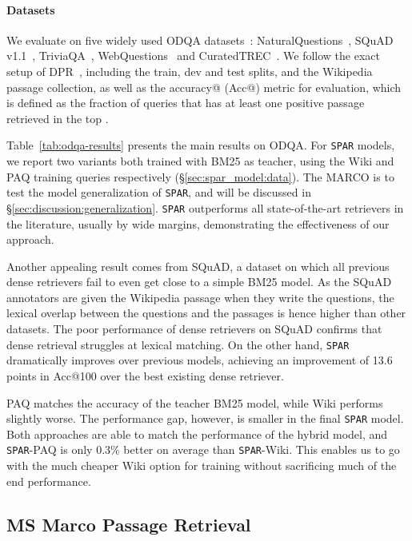 \documentclass[11pt]{article}
\newcommand{\spar}{\texttt{SPAR}\xspace}
\newcommand{\lexmodelsymbol}{\xspace}
\newcommand{\secref}[1]{\S\ref{#1}}
\begin{document}
\paragraph{Datasets}
We evaluate on five widely used ODQA datasets~\cite{lee-etal-2019-latent}: NaturalQuestions~\citep[NQ,][]{kwiatkowski-etal-2019-natural}, SQuAD v1.1~\citep{rajpurkar-etal-2016-squad}, TriviaQA~\citep{joshi-etal-2017-triviaqa}, WebQuestions~\citep[WebQ,][]{berant-etal-2013-semantic} and CuratedTREC~\citep[TREC,][]{trec}.
We follow the exact setup of DPR~\cite{karpukhin-etal-2020-dense}, including the train, dev and test splits, and the Wikipedia passage collection, as well as the accuracy@ (Acc@) metric for evaluation, which is defined as the fraction of queries that has at least one positive passage retrieved in the top .

Table~\ref{tab:odqa-results} presents the main results on ODQA.
For \spar{} models, we report two variants both trained with BM25 as teacher, using the Wiki and PAQ training queries respectively (\secref{sec:spar_model:data}).
The MARCO \lexmodelsymbol{} is to test the model generalization of \spar{}, and will be discussed in \secref{sec:discussion:generalization}.
\spar{} outperforms all state-of-the-art retrievers in the literature, usually by wide margins, demonstrating the effectiveness of our approach.

Another appealing result comes from SQuAD, a dataset on which all previous dense retrievers fail to even get close to a simple BM25 model.
As the SQuAD annotators are given the Wikipedia passage when they write the questions, the lexical overlap between the questions and the passages is hence higher than other datasets.
The poor performance of dense retrievers on SQuAD confirms that dense retrieval struggles at lexical matching.
On the other hand, \spar{} dramatically improves over previous models, achieving an improvement of 13.6 points in Acc@100 over the best existing dense retriever.

PAQ \lexmodelsymbol{} matches the accuracy of the teacher BM25 model, while Wiki \lexmodelsymbol{} performs slightly worse.
The performance gap, however, is smaller in the final \spar{} model.
Both approaches are able to match the performance of the hybrid model, and \spar{}-PAQ is only 0.3\% better on average than \spar{}-Wiki.
This enables us to go with the much cheaper Wiki option for training \lexmodelsymbol{} without sacrificing much of the end performance.

\subsection{MS Marco Passage Retrieval}\label{sec:exp:msmarco}
\end{document}
